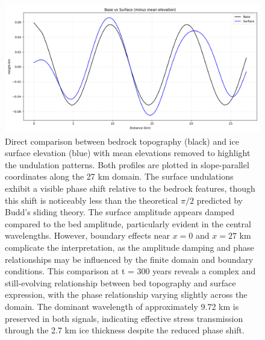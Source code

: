 \begin{figure}
    \includegraphics[scale=0.5]{direct.png}
    \caption{Direct comparison between bedrock topography (black) and ice surface elevation (blue) with mean elevations removed to highlight the undulation patterns. Both profiles are plotted in slope-parallel coordinates along the 27 km domain. The surface undulations exhibit a visible phase shift relative to the bedrock features, though this shift is noticeably less than the theoretical $\pi/2$ predicted by Budd's sliding theory. The surface amplitude appears damped compared to the bed amplitude, particularly evident in the central wavelengths. However, boundary effects near $x = 0$ and $x = 27$ km complicate the interpretation, as the amplitude damping and phase relationships may be influenced by the finite domain and boundary conditions. This comparison at t = 300 years reveals a complex and still-evolving relationship between bed topography and surface expression, with the phase relationship varying slightly across the domain. The dominant wavelength of approximately 9.72 km is preserved in both signals, indicating effective stress transmission through the 2.7 km ice thickness despite the reduced phase shift.}
    \label{fig:direct}
\end{figure}

